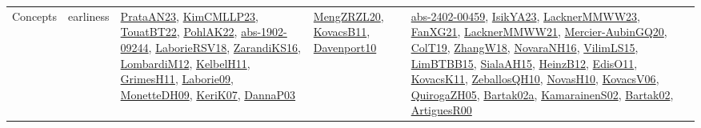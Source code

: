 {\begin{longtable}{lp{3cm}>{\raggedright}p{6cm}>{\raggedright}p{6cm}p{8cm}}
Concepts & earliness & \href{articles/PrataAN23.pdf}{PrataAN23}\cite{PrataAN23}, \href{papers/KimCMLLP23.pdf}{KimCMLLP23}\cite{KimCMLLP23}, \href{papers/TouatBT22.pdf}{TouatBT22}\cite{TouatBT22}, \href{articles/PohlAK22.pdf}{PohlAK22}\cite{PohlAK22}, \href{articles/abs-1902-09244.pdf}{abs-1902-09244}\cite{abs-1902-09244}, \href{articles/LaborieRSV18.pdf}{LaborieRSV18}\cite{LaborieRSV18}, \href{articles/ZarandiKS16.pdf}{ZarandiKS16}\cite{ZarandiKS16}, \href{articles/LombardiM12.pdf}{LombardiM12}\cite{LombardiM12}, \href{articles/KelbelH11.pdf}{KelbelH11}\cite{KelbelH11}, \href{papers/GrimesH11.pdf}{GrimesH11}\cite{GrimesH11}, \href{papers/Laborie09.pdf}{Laborie09}\cite{Laborie09}, \href{papers/MonetteDH09.pdf}{MonetteDH09}\cite{MonetteDH09}, \href{papers/KeriK07.pdf}{KeriK07}\cite{KeriK07}, \href{papers/DannaP03.pdf}{DannaP03}\cite{DannaP03} & \href{articles/MengZRZL20.pdf}{MengZRZL20}\cite{MengZRZL20}, \href{articles/KovacsB11.pdf}{KovacsB11}\cite{KovacsB11}, \href{papers/Davenport10.pdf}{Davenport10}\cite{Davenport10} & \href{articles/abs-2402-00459.pdf}{abs-2402-00459}\cite{abs-2402-00459}, \href{articles/IsikYA23.pdf}{IsikYA23}\cite{IsikYA23}, \href{articles/LacknerMMWW23.pdf}{LacknerMMWW23}\cite{LacknerMMWW23}, \href{articles/FanXG21.pdf}{FanXG21}\cite{FanXG21}, \href{papers/LacknerMMWW21.pdf}{LacknerMMWW21}\cite{LacknerMMWW21}, \href{papers/Mercier-AubinGQ20.pdf}{Mercier-AubinGQ20}\cite{Mercier-AubinGQ20}, \href{papers/ColT19.pdf}{ColT19}\cite{ColT19}, \href{articles/ZhangW18.pdf}{ZhangW18}\cite{ZhangW18}, \href{articles/NovaraNH16.pdf}{NovaraNH16}\cite{NovaraNH16}, \href{papers/VilimLS15.pdf}{VilimLS15}\cite{VilimLS15}, \href{papers/LimBTBB15.pdf}{LimBTBB15}\cite{LimBTBB15}, \href{papers/SialaAH15.pdf}{SialaAH15}\cite{SialaAH15}, \href{papers/HeinzB12.pdf}{HeinzB12}\cite{HeinzB12}, \href{papers/EdisO11.pdf}{EdisO11}\cite{EdisO11}, \href{articles/KovacsK11.pdf}{KovacsK11}\cite{KovacsK11}, \href{articles/ZeballosQH10.pdf}{ZeballosQH10}\cite{ZeballosQH10}, \href{articles/NovasH10.pdf}{NovasH10}\cite{NovasH10}, \href{papers/KovacsV06.pdf}{KovacsV06}\cite{KovacsV06}, \href{papers/QuirogaZH05.pdf}{QuirogaZH05}\cite{QuirogaZH05}, \href{papers/Bartak02a.pdf}{Bartak02a}\cite{Bartak02a}, \href{papers/KamarainenS02.pdf}{KamarainenS02}\cite{KamarainenS02}, \href{papers/Bartak02.pdf}{Bartak02}\cite{Bartak02}, \href{articles/ArtiguesR00.pdf}{ArtiguesR00}\cite{ArtiguesR00}\\

\end{longtable}}
